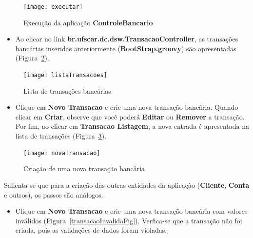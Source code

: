 \vspace{0.2cm}

\begin{figure}[htbp]
\centering\texttt{[image: executar]}
\caption{Execução da aplicação {\bf ControleBancario}}
\label{executarFig}
\end{figure}

\vspace{0.3cm}

\begin{itemize}

\item   Ao  clicar  no   link  {\bf   br.ufscar.dc.dsw.TransacaoController},  as
  transações  bancárias  inseridas  anteriormente ({\bf  BootStrap.groovy})  são
  apresentadas (Figura~\ref{listaTransacoesFig}). 

\end{itemize}

\begin{figure}[htbp]
\centering\texttt{[image: listaTransacoes]}
\caption{Lista de transações bancárias}
\label{listaTransacoesFig}
\end{figure}

\vspace{0.2cm}

\begin{itemize}

\item Clique em {\bf Novo Transacao}  e crie uma nova transação bancária. Quando
  clicar em {\bf Criar}, observe que você poderá {\bf Editar} ou {\bf Remover} a
  transação. Por  fim, ao clicar em  {\bf Transacao Listagem}, a  nova entrada é
  apresentada na lista de transações (Figura~\ref{novaTransacaoFig}). 

 \end{itemize}

\begin{figure}[htbp]
\centering\texttt{[image: novaTransacao]}
\caption{Criação de uma nova transação bancária}
\label{novaTransacaoFig}
\end{figure}

Salienta-se que para a criação das outras entidades da aplicação ({\bf Cliente},
{\bf Conta} e outros), os passos são análogos.  

\newpage

\begin{itemize}

\item Clique  em {\bf  Novo Transacao}  e crie uma  nova transação  bancária com
  valores  inválidos   (Figura~\ref{transacaoInvalidaFig}).   Verfica-se  que  a
  transação não foi criada, pois as validações de dados foram violadas. 

\end{itemize}

